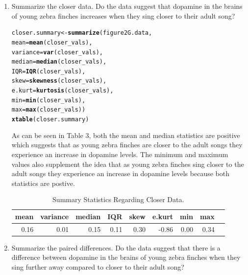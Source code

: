 \documentclass{article}\usepackage[]{graphicx}\usepackage[]{xcolor}
\makeatletter
\newcommand{\hldef}[1]{\textcolor[rgb]{0.345,0.345,0.345}{#1}}%
\newcommand{\hlkwb}[1]{\textcolor[rgb]{0.69,0.353,0.396}{#1}}%
\newcommand{\hlkwc}[1]{\textcolor[rgb]{0.333,0.667,0.333}{#1}}%
\newcommand{\hlkwd}[1]{\textcolor[rgb]{0.737,0.353,0.396}{\textbf{#1}}}%
\newenvironment{kframe}{%
 \def\at@end@of@kframe{}%
 \ifinner\ifhmode%
  \def\at@end@of@kframe{\end{minipage}}%
  \begin{minipage}{\columnwidth}%
 \fi\fi%
 \def\FrameCommand##1{\hskip\@totalleftmargin \hskip-\fboxsep
 \colorbox{shadecolor}{##1}\hskip-\fboxsep
     \hskip-\linewidth \hskip-\@totalleftmargin \hskip\columnwidth}%
 \MakeFramed {\advance\hsize-\width
   \@totalleftmargin\z@ \linewidth\hsize
   \@setminipage}}%
 {\par\unskip\endMakeFramed%
 \at@end@of@kframe}
\newenvironment{knitrout}{}{} %
\makeatother
\begin{document}
\begin{enumerate}
\begin{enumerate}
   \item Summarize the closer data. Do the data suggest that
   dopamine in the brains of young zebra finches increases when
   they sing closer to their adult song?

\begin{knitrout}
\color{fgcolor}\begin{kframe}
\begin{alltt}
\hldef{closer.summary} \hlkwb{<-} \hlkwd{summarize}\hldef{(figure2G.data,}
                             \hlkwc{mean} \hldef{=} \hlkwd{mean}\hldef{(closer_vals),}
                             \hlkwc{variance} \hldef{=} \hlkwd{var}\hldef{(closer_vals),}
                             \hlkwc{median} \hldef{=} \hlkwd{median}\hldef{(closer_vals),}
                             \hlkwc{IQR} \hldef{=} \hlkwd{IQR}\hldef{(closer_vals),}
                             \hlkwc{skew} \hldef{=} \hlkwd{skewness}\hldef{(closer_vals),}
                             \hlkwc{e.kurt} \hldef{=} \hlkwd{kurtosis}\hldef{(closer_vals),}
                             \hlkwc{min} \hldef{=} \hlkwd{min}\hldef{(closer_vals),}
                             \hlkwc{max} \hldef{=} \hlkwd{max}\hldef{(closer_vals))}
\hlkwd{xtable}\hldef{(closer.summary)}
\end{alltt}
\end{kframe}
\end{knitrout}

As can be seen in Table 3, both the mean and median statistics are positive which suggests that as young zebra finches are closer to the adult songs they experience an increase in dopamine levels. The minimum and maximum values also supplement the idea that as young zebra finches sing closer to the adult songs they experience an increase in dopamine levels because both statistics are postive.

\begin{table}[ht]
\centering
\begin{tabular}{rrrrrrrrr}
  \hline
mean & variance & median & IQR & skew & e.kurt & min & max \\ 
  \hline
0.16 & 0.01 & 0.15 & 0.11 & 0.30 & -0.86 & 0.00 & 0.34 \\ 
   \hline
\end{tabular}
\caption{Summary Statistics Regarding Closer Data.}
\label{table3}
\end{table}

  \item Summarize the paired differences. Do the data suggest
  that there is a difference between dopamine in the brains of
  young zebra finches when they sing further away compared to 
  closer to their adult song?


\end{enumerate}
\end{enumerate}
\end{document}
